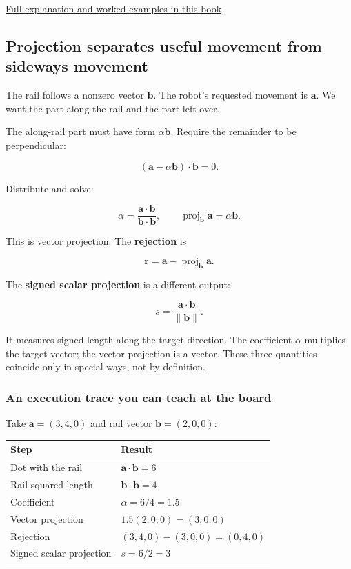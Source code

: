 \hyperref[01-foundations-i-ch020-qr-turns-least-squares-into-a-triangular-solve-plus-an-irreducible-residual]{Full explanation and worked examples in this book}

\subsection{Projection separates useful movement from sideways movement}\label{01-foundations-i-ch017-projection-separates-useful-movement-from-sideways-movement}

The rail follows a nonzero vector \(\mathbf b\). The robot's requested movement is \(\mathbf a\). We want the part along the rail and the part left over.

The along-rail part must have form \(\alpha\mathbf b\). Require the remainder to be perpendicular:

\[
(\mathbf a-\alpha\mathbf b)\cdot\mathbf b=0.
\]

Distribute and solve:

\[
\alpha=\frac{\mathbf a\cdot\mathbf b}{\mathbf b\cdot\mathbf b},\qquad
\operatorname{proj}_{\mathbf b}\mathbf a=\alpha\mathbf b.
\]

This is \hyperref[01-foundations-i-ch017-projection-separates-useful-movement-from-sideways-movement]{vector projection}. The \textbf{rejection} is

\[
\mathbf r=\mathbf a-\operatorname{proj}_{\mathbf b}\mathbf a.
\]

The \textbf{signed scalar projection} is a different output:

\[
s=\frac{\mathbf a\cdot\mathbf b}{\|\mathbf b\|}.
\]

It measures signed length along the target direction. The coefficient \(\alpha\) multiplies the target vector; the vector projection is a vector. These three quantities coincide only in special ways, not by definition.

\subsubsection{An execution trace you can teach at the board}\label{01-foundations-i-ch017-an-execution-trace-you-can-teach-at-the-board}

Take \(\mathbf a=(3,4,0)\) and rail vector \(\mathbf b=(2,0,0)\):

{\def\LTcaptype{none} %
\begin{longtable}[]{@{}ll@{}}
\toprule\noalign{}
Step & Result \\
\midrule\noalign{}
\endhead
\bottomrule\noalign{}
\endlastfoot
Dot with the rail & \(\mathbf a\cdot\mathbf b=6\) \\
Rail squared length & \(\mathbf b\cdot\mathbf b=4\) \\
Coefficient & \(\alpha=6/4=1.5\) \\
Vector projection & \(1.5(2,0,0)=(3,0,0)\) \\
Rejection & \((3,4,0)-(3,0,0)=(0,4,0)\) \\
Signed scalar projection & \(s=6/2=3\) \\
\end{longtable}
}

